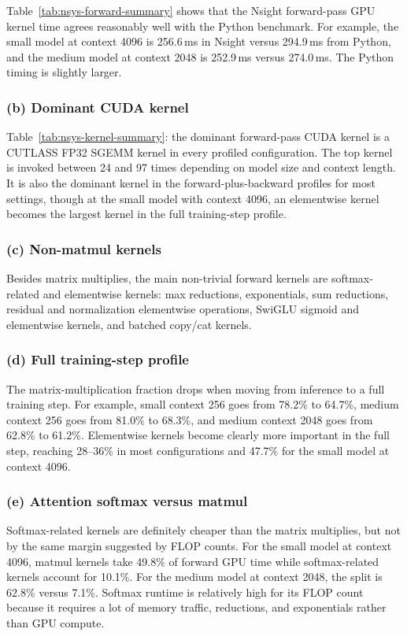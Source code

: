 \documentclass[11pt]{article}
\newcommand{\subquestion}[1]{\subsubsection*{#1}}
\begin{document}
\begin{table}[H]
  \centering
  
  \caption{Forward-pass time from Nsight Systems CUDA GPU kernel summaries compared with the Python standard-library timing benchmark.}
  \label{tab:nsys-forward-summary}
\end{table}

Table~\ref{tab:nsys-forward-summary} shows that the Nsight forward-pass GPU kernel time agrees reasonably well with the Python benchmark. For example, the small model at context 4096 is 256.6\,ms in Nsight versus 294.9\,ms from Python, and the medium model at context 2048 is 252.9\,ms versus 274.0\,ms. The Python timing is slightly larger.

\subquestion{(b) Dominant CUDA kernel}
\begin{table}[H]
  \centering
  \resizebox{\textwidth}{!}{}
  \caption{Dominant forward-pass kernel family and aggregate kernel fractions from Nsight Systems. ``FBO'' denotes the full forward, backward, and optimizer-step profile.}
  \label{tab:nsys-kernel-summary}
\end{table}

Table~\ref{tab:nsys-kernel-summary}: the dominant forward-pass CUDA kernel is a CUTLASS FP32 SGEMM kernel in every profiled configuration. The top kernel is invoked between 24 and 97 times depending on model size and context length. It is also the dominant kernel in the forward-plus-backward profiles for most settings, though at the small model with context 4096, an elementwise kernel becomes the largest kernel in the full training-step profile.

\subquestion{(c) Non-matmul kernels}
Besides matrix multiplies, the main non-trivial forward kernels are softmax-related and elementwise kernels: max reductions, exponentials, sum reductions, residual and normalization elementwise operations, SwiGLU sigmoid and elementwise kernels, and batched copy/cat kernels.

\subquestion{(d) Full training-step profile}
The matrix-multiplication fraction drops when moving from inference to a full training step. For example, small context 256 goes from 78.2\% to 64.7\%, medium context 256 goes from 81.0\% to 68.3\%, and medium context 2048 goes from 62.8\% to 61.2\%. Elementwise kernels become clearly more important in the full step, reaching 28--36\% in most configurations and 47.7\% for the small model at context 4096.

\subquestion{(e) Attention softmax versus matmul}
Softmax-related kernels are definitely cheaper than the matrix multiplies, but not by the same margin suggested by FLOP counts. For the small model at context 4096, matmul kernels take 49.8\% of forward GPU time while softmax-related kernels account for 10.1\%. For the medium model at context 2048, the split is 62.8\% versus 7.1\%. Softmax runtime is relatively high for its FLOP count because it requires a lot of memory traffic, reductions, and exponentials rather than GPU compute.
\end{document}

